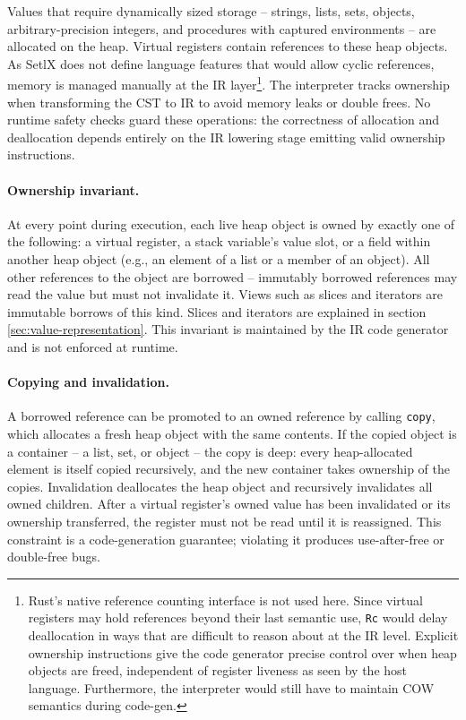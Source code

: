 Values that require dynamically sized storage -- strings, lists, sets, objects, arbitrary-precision integers, and procedures with captured environments -- are allocated on the heap. Virtual registers contain references to these heap objects. As SetlX does not define language features that would allow cyclic references, memory is managed manually at the \ac{IR} layer\footnote{Rust's native reference counting interface is not used here. Since virtual registers may hold references beyond their last semantic use, \texttt{Rc} would delay deallocation in ways that are difficult to reason about at the IR level. Explicit ownership instructions give the code generator precise control over when heap objects are freed, independent of register liveness as seen by the host language. Furthermore, the interpreter would still have to maintain \ac{COW} semantics during code-gen.}. The interpreter tracks ownership when transforming the \ac{CST} to \ac{IR} to avoid memory leaks or double frees. No runtime safety checks guard these operations: the correctness of allocation and deallocation depends entirely on the \ac{IR} lowering stage emitting valid ownership instructions.

\paragraph{Ownership invariant.}
At every point during execution, each live heap object is owned by exactly one of the following: a virtual register, a stack variable's value slot, or a field within another heap object (e.g., an element of a list or a member of an object). All other references to the object are borrowed -- immutably borrowed references may read the value but must not invalidate it. Views such as slices and iterators are immutable borrows of this kind. Slices and iterators are explained in section \ref{sec:value-representation}. This invariant is maintained by the \ac{IR} code generator and is not enforced at runtime.

\paragraph{Copying and invalidation.}
A borrowed reference can be promoted to an owned reference by calling \texttt{copy}, which allocates a fresh heap object with the same contents. If the copied object is a container -- a list, set, or object -- the copy is deep: every heap-allocated element is itself copied recursively, and the new container takes ownership of the copies. Invalidation deallocates the heap object and recursively invalidates all owned children. After a virtual register's owned value has been invalidated or its ownership transferred, the register must not be read until it is reassigned. This constraint is a code-generation guarantee; violating it produces use-after-free or double-free bugs.

